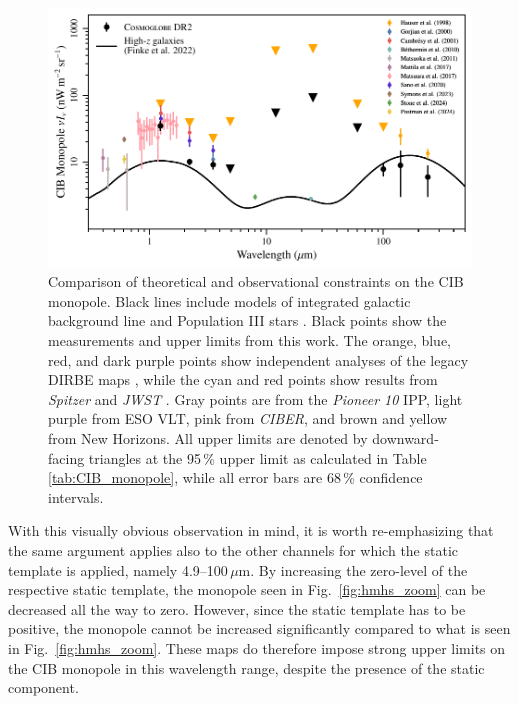 \documentclass{aa}
\begin{document}
\begin{figure}
	\centering
	\includegraphics[width=\textwidth]{figs/CIB_mono.pdf}
	\caption{
		Comparison of theoretical and observational constraints on the CIB monopole. Black lines include models of integrated galactic background line \citep{finke2022} and Population III stars \citep{santos:2002}. Black points show the measurements and upper limits from this work. The orange, blue, red, and dark purple points show independent analyses of the legacy DIRBE maps \citep{hauser1998,gorjian:2000,cambresy:2001,sano:2020}, while the cyan and red points show results from \textit{Spitzer} \citep{bethermin:2010} and \textit{JWST} \citep{stone:2024}. Gray points \citep{matsuoka:2011} are from the \textit{Pioneer 10} IPP, light purple \citep{mattila:2017} from ESO VLT, pink \citep{matsuura:2017} from \textit{CIBER}, and brown \citep{symons:2023} and yellow \citep{postman:2024} from New Horizons.
		All upper limits are denoted by downward-facing triangles at the 95\,\% upper limit as calculated in Table \ref{tab:CIB_monopole}, while all error bars are 68\,\% confidence intervals.
	}
	\label{fig:CIB_monopoles}
\end{figure}


With this visually obvious observation in mind, it is worth
re-emphasizing that the same argument applies also to the other
channels for which the static template is applied, namely
4.9--100$\,\mu\mathrm{m}$. By increasing the zero-level of the
respective static template, the monopole seen in
Fig.~\ref{fig:hmhs_zoom} can be decreased all the way to
zero. However, since the static template has to be positive, the monopole
cannot be increased significantly compared to what is seen in
Fig.~\ref{fig:hmhs_zoom}. These maps do therefore impose strong upper
limits on the CIB monopole in this wavelength range, despite the
presence of the static component.
\end{document}
